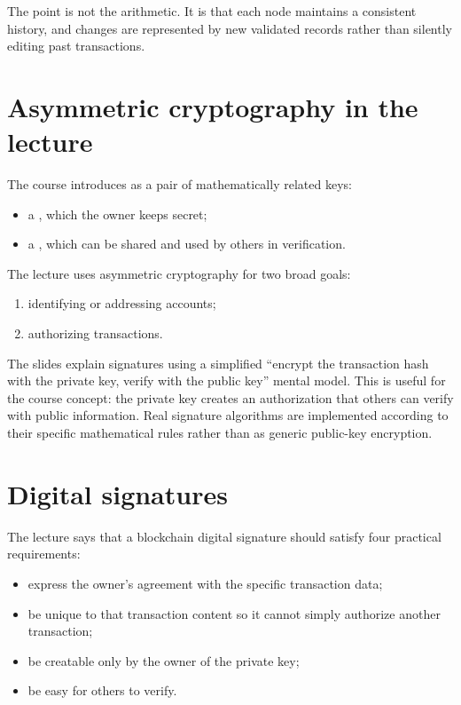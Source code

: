 The point is not the arithmetic. It is that each node maintains a consistent history, and changes are represented by new validated records rather than silently editing past transactions.

\section{Asymmetric cryptography in the lecture}

The course introduces  as a pair of mathematically related keys:

\begin{itemize}
  \item a , which the owner keeps secret;
  \item a , which can be shared and used by others in verification.
\end{itemize}

The lecture uses asymmetric cryptography for two broad goals:

\begin{enumerate}
  \item identifying or addressing accounts;
  \item authorizing transactions.
\end{enumerate}

\begin{libnote}
The slides explain signatures using a simplified ``encrypt the transaction hash with the private key, verify with the public key'' mental model. This is useful for the course concept: the private key creates an authorization that others can verify with public information. Real signature algorithms are implemented according to their specific mathematical rules rather than as generic public-key encryption.
\end{libnote}

\section{Digital signatures}

The lecture says that a blockchain digital signature should satisfy four practical requirements:

\begin{itemize}
  \item express the owner's agreement with the specific transaction data;
  \item be unique to that transaction content so it cannot simply authorize another transaction;
  \item be creatable only by the owner of the private key;
  \item be easy for others to verify.
\end{itemize}

